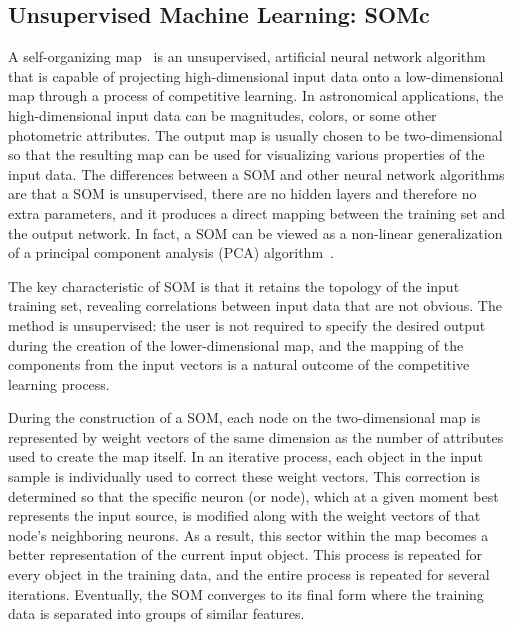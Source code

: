\documentclass[useAMS,usenatbib]{mn2e}
\begin{document}
\subsection{Unsupervised Machine Learning: SOMc}

A self-organizing map~\citep{kohonen1990self, kohonen2001self}
is an unsupervised, artificial neural network algorithm
that is capable of projecting high-dimensional input data
onto a low-dimensional map
through a process of competitive learning.
In astronomical applications,
the high-dimensional input data can be
magnitudes, colors, or some other photometric attributes.
The output map is usually chosen to be two-dimensional
so that the resulting map can be used for visualizing
various properties of the input data.
The differences between a SOM and other neural network algorithms are
that a SOM is unsupervised,
there are no hidden layers and therefore no extra parameters,
and it produces a direct mapping
between the training set and the output network.
In fact, a SOM can be viewed as a non-linear generalization
of a principal component analysis (PCA) algorithm~\citep{yin2008self}.

The key characteristic of SOM is that
it retains the topology of the input training set,
revealing correlations between input data that are not obvious.
The method is unsupervised:
the user is not required to specify the desired output
during the creation of the lower-dimensional map,
and the mapping of the components from the input vectors
is a natural outcome of the competitive learning process.

During the construction of a SOM,
each node on the two-dimensional map is represented by
weight vectors of the same dimension
as the number of attributes used to create the map itself.
In an iterative process,
each object in the input sample is individually used
to correct these weight vectors.
This correction is determined so that the specific neuron (or node),
which at a given moment best represents the input source,
is modified along with the weight vectors
of that node's neighboring neurons.
As a result, this sector within the map
becomes a better representation of the current input object.
This process is repeated for every object in the training data,
and the entire process is repeated for several iterations.
Eventually, the SOM converges to its final form where
the training data is separated into groups of similar features.
\end{document}
